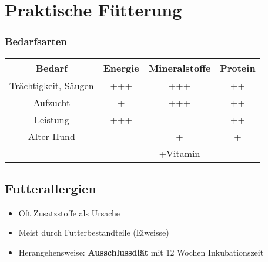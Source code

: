 \section{Praktische Fütterung}
    \subsubsection{Bedarfsarten}
        \begin{tabular}{c|ccc}
            \textbf{Bedarf}         &   \textbf{Energie}    & \textbf{Mineralstoffe}    & \textbf{Protein} \\
            \hline
            Trächtigkeit, Säugen    &   +++                 & +++           & ++ \\
            Aufzucht                &   +                   & +++           & ++  \\
            Leistung                &   +++                 &               & ++ \\
            Alter Hund              &   -                   & +             & + \\
                                    &                       & +Vitamin      & \\
        \end{tabular}

    \subsection{Futterallergien}
        \begin{itemize}
            \item Oft Zusatzstoffe als Ursache
            \item Meist durch Futterbestandteile (Eiweisse)
            \item Herangehensweise: \textbf{Ausschlussdiät} mit 12 Wochen \glqq Inkubationszeit \grqq{}
        \end{itemize}

